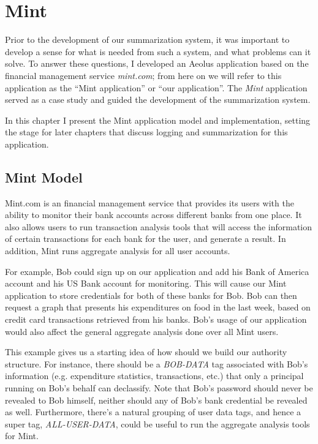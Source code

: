 \chapter{Mint}\label{mint}

Prior to the development of our summarization system, it was important to develop a sense for what is needed from such a system, and what problems can it solve. To answer these questions, I developed an Aeolus application based on the financial management service \emph{mint.com}\cite{mint}; from here on we will refer to this application as the ``Mint application'' or ``our application''. The \emph{Mint} application served as a case study and guided the development of the summarization system.

In this chapter I present the Mint application model and implementation, setting the stage for later chapters that discuss logging and summarization for this application.

\section{Mint Model}

Mint.com is an financial management service that provides its users with the ability to monitor their bank accounts across different banks from one place. It also allows users to run transaction analysis tools that will access the information of certain transactions for each bank for the user, and generate a result. In addition, Mint runs aggregate analysis for all user accounts.

For example, Bob could sign up on our application and add his Bank of America account and his US Bank account for monitoring. This will cause our Mint application to store credentials for both of these banks for Bob. Bob can then request a graph that presents his expenditures on food in the last week, based on credit card transactions retrieved from his banks. Bob's usage of our application would also affect the general aggregate analysis done over all Mint users.

This example gives us a starting idea of how should we build our authority structure. For instance, there should be a \emph{BOB-DATA} tag associated with Bob's information (e.g. expenditure statistics, transactions, etc.) that only a principal running on Bob's behalf can declassify. Note that Bob's password should never be revealed to Bob himself, neither should any of Bob's bank credential be revealed as well. Furthermore, there's a natural grouping of user data tags, and hence a super tag, \emph{ALL-USER-DATA}, could be useful to run the aggregate analysis tools for Mint.

